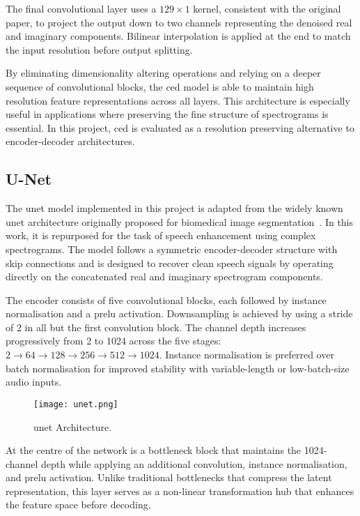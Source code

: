 The final convolutional layer uses a \(129 \times 1\) kernel, consistent with the original paper, to project the output down to two channels representing the denoised real and imaginary components. Bilinear interpolation is applied at the end to match the input resolution before output splitting.

By eliminating dimensionality altering operations and relying on a deeper sequence of convolutional blocks, the \gls{ced} model is able to maintain high resolution feature representations across all layers. This architecture is especially useful in applications where preserving the fine structure of spectrograms is essential. In this project, \gls{ced} is evaluated as a resolution preserving alternative to encoder-decoder architectures.

\subsection{U-Net}
\label{sec:unet}

The \gls{unet} model implemented in this project is adapted from the widely known \gls{unet} architecture originally proposed for biomedical image segmentation~\cite{ronneberger2015unet}. In this work, it is repurposed for the task of speech enhancement using complex spectrograms. The model follows a symmetric encoder-decoder structure with skip connections and is designed to recover clean speech signals by operating directly on the concatenated real and imaginary spectrogram components.

The encoder consists of five convolutional blocks, each followed by instance normalisation and a \gls{prelu} activation. Downsampling is achieved by using a stride of 2 in all but the first convolution block. The channel depth increases progressively from 2 to 1024 across the five stages: \(2 \rightarrow 64 \rightarrow 128 \rightarrow 256 \rightarrow 512 \rightarrow 1024\). Instance normalisation is preferred over batch normalisation for improved stability with variable-length or low-batch-size audio inputs.

\begin{figure}[h]
    \centering
    \texttt{[image: unet.png]}
    \caption{\label{fig:unet}\gls{unet} Architecture.}
\end{figure}

At the centre of the network is a bottleneck block that maintains the 1024-channel depth while applying an additional convolution, instance normalisation, and \gls{prelu} activation. Unlike traditional bottlenecks that compress the latent representation, this layer serves as a non-linear transformation hub that enhances the feature space before decoding.

